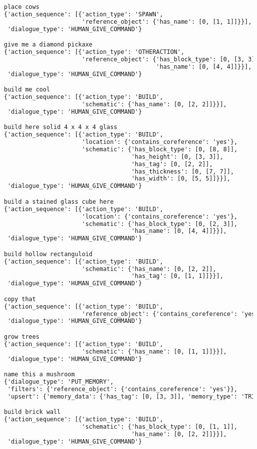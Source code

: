 \begin{lstlisting}[language=TeX]
place cows
{'action_sequence': [{'action_type': 'SPAWN',
                      'reference_object': {'has_name': [0, [1, 1]]}}],
 'dialogue_type': 'HUMAN_GIVE_COMMAND'}

give me a diamond pickaxe
{'action_sequence': [{'action_type': 'OTHERACTION',
                      'reference_object': {'has_block_type': [0, [3, 3]],
                                           'has_name': [0, [4, 4]]}}],
 'dialogue_type': 'HUMAN_GIVE_COMMAND'}

build me cool
{'action_sequence': [{'action_type': 'BUILD',
                      'schematic': {'has_name': [0, [2, 2]]}}],
 'dialogue_type': 'HUMAN_GIVE_COMMAND'}

build here solid 4 x 4 x 4 glass
{'action_sequence': [{'action_type': 'BUILD',
                      'location': {'contains_coreference': 'yes'},
                      'schematic': {'has_block_type': [0, [8, 8]],
                                    'has_height': [0, [3, 3]],
                                    'has_tag': [0, [2, 2]],
                                    'has_thickness': [0, [7, 7]],
                                    'has_width': [0, [5, 5]]}}],
 'dialogue_type': 'HUMAN_GIVE_COMMAND'}

build a stained glass cube here
{'action_sequence': [{'action_type': 'BUILD',
                      'location': {'contains_coreference': 'yes'},
                      'schematic': {'has_block_type': [0, [2, 3]],
                                    'has_name': [0, [4, 4]]}}],
 'dialogue_type': 'HUMAN_GIVE_COMMAND'}

build hollow rectanguloid
{'action_sequence': [{'action_type': 'BUILD',
                      'schematic': {'has_name': [0, [2, 2]],
                                    'has_tag': [0, [1, 1]]}}],
 'dialogue_type': 'HUMAN_GIVE_COMMAND'}

copy that
{'action_sequence': [{'action_type': 'BUILD',
                      'reference_object': {'contains_coreference': 'yes'}}],
 'dialogue_type': 'HUMAN_GIVE_COMMAND'}

grow trees
{'action_sequence': [{'action_type': 'BUILD',
                      'schematic': {'has_name': [0, [1, 1]]}}],
 'dialogue_type': 'HUMAN_GIVE_COMMAND'}

name this a mushroom
{'dialogue_type': 'PUT_MEMORY',
 'filters': {'reference_object': {'contains_coreference': 'yes'}},
 'upsert': {'memory_data': {'has_tag': [0, [3, 3]], 'memory_type': 'TRIPLE'}}}

build brick wall
{'action_sequence': [{'action_type': 'BUILD',
                      'schematic': {'has_block_type': [0, [1, 1]],
                                    'has_name': [0, [2, 2]]}}],
 'dialogue_type': 'HUMAN_GIVE_COMMAND'}


\end{lstlisting}
